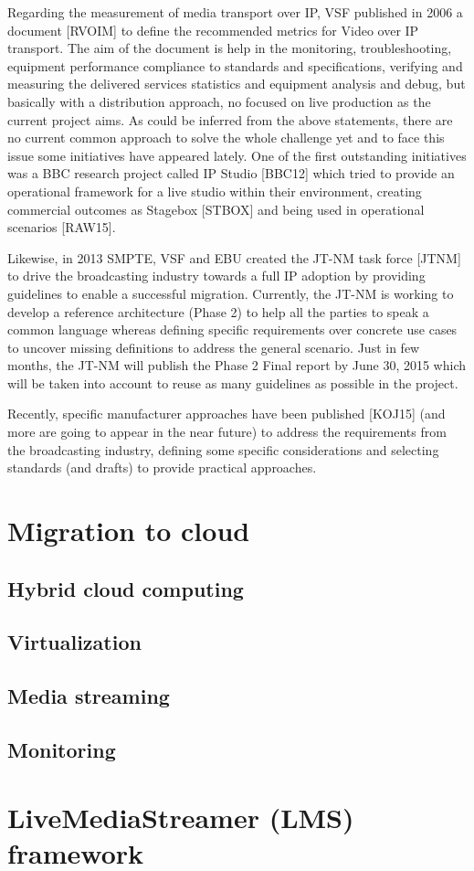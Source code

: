 Regarding the measurement of media transport over IP, VSF published in 2006 a document [RVOIM]
to define the recommended metrics for Video over IP transport. The aim of the document is help in
the monitoring, troubleshooting, equipment performance compliance to standards and specifications,
verifying and measuring the delivered services statistics and equipment analysis and debug, but
basically with a distribution approach, no focused on live production as the current project aims.
As could be inferred from the above statements, there are no current common approach to solve the
whole challenge yet and to face this issue some initiatives have appeared lately. One of the first
outstanding initiatives was a BBC research project called IP Studio [BBC12] which tried to provide
an operational framework for a live studio within their environment, creating commercial outcomes
as Stagebox [STBOX] and being used in operational scenarios [RAW15].

Likewise, in 2013 SMPTE, VSF and EBU created the JT-NM task force [JTNM] to drive the
broadcasting industry towards a full IP adoption by providing guidelines to enable a successful
migration. Currently, the JT-NM is working to develop a reference architecture (Phase 2) to help all
the parties to speak a common language whereas defining specific requirements over concrete use
cases to uncover missing definitions to address the general scenario. Just in few months, the JT-NM
will publish the Phase 2 Final report by June 30, 2015 which will be taken into account to reuse as
many guidelines as possible in the project.

Recently, specific manufacturer approaches have been published [KOJ15] (and more are going to
appear in the near future) to address the requirements from the broadcasting industry, defining some
specific considerations and selecting standards (and drafts) to provide practical approaches.


\section{Migration to cloud}

\subsection{Hybrid cloud computing}


\subsection{Virtualization}


\subsection{Media streaming}


\subsection{Monitoring}


\section{LiveMediaStreamer (LMS) framework}







